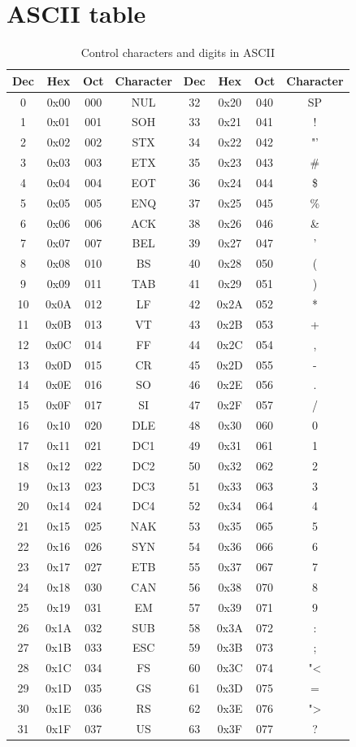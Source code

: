 \section*{ASCII table}
\label{sec:ascii}
\begin{longtable}{|c|c|c|c||c|c|c|c|}
	\caption{Control characters and digits in ASCII}\\
	\hline
	Dec & Hex & Oct & Character & Dec & Hex & Oct & Character\\
	\hline
	0 & 0x00 & 000 & NUL & 32 & 0x20 & 040 & SP\\
	1 & 0x01 & 001 & SOH & 33 & 0x21 & 041 & ! \\
	2 & 0x02 & 002 & STX & 34 & 0x22 & 042 & "'\\
	3 & 0x03 & 003 & ETX & 35 & 0x23 & 043 & \# \\
	4 & 0x04 & 004 & EOT & 36 & 0x24 & 044 & \$ \\
	5 & 0x05 & 005 & ENQ & 37 & 0x25 & 045 & \% \\
	6 & 0x06 & 006 & ACK & 38 & 0x26 & 046 & \& \\
	7 & 0x07 & 007 & BEL & 39 & 0x27 & 047 & ' \\
	8 & 0x08 & 010 & BS & 40 & 0x28 & 050 & (  \\
	9 & 0x09 & 011 & TAB & 41 & 0x29 & 051 &  ) \\
	10 & 0x0A & 012 & LF & 42 & 0x2A & 052 & * \\
	11 & 0x0B & 013 & VT & 43 & 0x2B & 053 & + \\
	12 & 0x0C & 014 & FF & 44 & 0x2C & 054 & , \\
	13 & 0x0D & 015 & CR & 45 & 0x2D & 055 & - \\
	14 & 0x0E & 016 & SO & 46 & 0x2E & 056 & . \\
	15 & 0x0F & 017 & SI & 47 & 0x2F & 057 & / \\
	16 & 0x10 & 020 & DLE & 48 & 0x30 & 060 & 0 \\
	17 & 0x11 & 021 & DC1 & 49 & 0x31 & 061 & 1 \\
	18 & 0x12 & 022 & DC2 & 50 & 0x32 & 062 & 2 \\
	19 & 0x13 & 023 & DC3 & 51 & 0x33 & 063 & 3 \\
	20 & 0x14 & 024 & DC4 & 52 & 0x34 & 064 & 4 \\
	21 & 0x15 & 025 & NAK & 53 & 0x35 & 065 & 5 \\
	22 & 0x16 & 026 & SYN & 54 & 0x36 & 066 & 6 \\
	23 & 0x17 & 027 & ETB & 55 & 0x37 & 067 & 7 \\
	24 & 0x18 & 030 & CAN & 56 & 0x38 & 070 & 8 \\
	25 & 0x19 & 031 & EM & 57 & 0x39 & 071 & 9 \\
	26 & 0x1A & 032 & SUB & 58 & 0x3A & 072 & : \\
	27 & 0x1B & 033 & ESC & 59 & 0x3B & 073 & ; \\
	28 & 0x1C & 034 & FS & 60 & 0x3C & 074 & "< \\
	29 & 0x1D & 035 & GS & 61 & 0x3D & 075 & =\\
	30 & 0x1E & 036 & RS & 62 & 0x3E & 076 & "> \\
	31 & 0x1F & 037 & US & 63 & 0x3F & 077 & ? \\
	\hline
\end{longtable}
